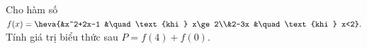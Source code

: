 \begin{ex}
\begin{ex}%
	Cho hàm số $f(x)=\heva{&x^2+2x-1 &\quad\text{khi } x\ge2\\&2-3x &\quad \text{khi } x<2}.$ \\
	Tính giá trị biểu thức sau $P=f(4)+f(0)$.
\end{ex}


\end{ex}
